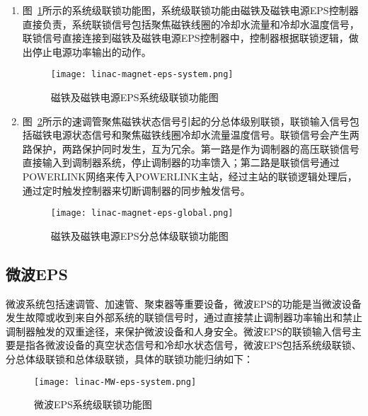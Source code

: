 \begin{enumerate}
  \item 图~\ref{fig:linac-magnet-eps-system}所示的系统级联锁功能图，系统级联锁功能由磁铁及磁铁电源EPS控制器直接负责，系统联锁信号包括聚焦磁铁线圈的冷却水流量和冷却水温度信号，联锁信号直接连接到磁铁及磁铁电源EPS控制器中，控制器根据联锁逻辑，做出停止电源功率输出的动作。

  \begin{figure}[!htb]
	\centering
	\texttt{[image: linac-magnet-eps-system.png]}
	\caption{磁铁及磁铁电源EPS系统级联锁功能图}
	\label{fig:linac-magnet-eps-system}
\end{figure}

  \item 图~\ref{fig:linac-magnet-eps-global}所示的速调管聚焦磁铁状态信号引起的分总体级别联锁，联锁输入信号包括磁铁电源状态信号和聚焦磁铁线圈冷却水流量温度信号。联锁信号会产生两路保护，两路保护同时发生，互为冗余。第一路是作为调制器的高压联锁信号直接输入到调制器系统，停止调制器的功率馈入；第二路是联锁信号通过POWERLINK网络来传入POWERLINK主站，经过主站的联锁逻辑处理后，通过定时触发控制器来切断调制器的同步触发信号。

  \begin{figure}[!htb]
	\centering
	\texttt{[image: linac-magnet-eps-global.png]}
	\caption{磁铁及磁铁电源EPS分总体级联锁功能图}
	\label{fig:linac-magnet-eps-global}
\end{figure}
\end{enumerate}


\subsection{微波EPS}
微波系统包括速调管、加速管、聚束器等重要设备，微波EPS的功能是当微波设备发生故障或收到来自外部系统的联锁信号时，通过直接禁止调制器功率输出和禁止调制器触发的双重途径，来保护微波设备和人身安全。微波EPS的联锁输入信号主要是指各微波设备的真空状态信号和冷却水状态信号，微波EPS包括系统级联锁、分总体级联锁和总体级联锁，具体的联锁功能归纳如下：

 \begin{figure}[!htb]
	\centering
	\texttt{[image: linac-MW-eps-system.png]}
	\caption{微波EPS系统级联锁功能图}
	\label{fig:linac-MW-eps-system}
\end{figure}


